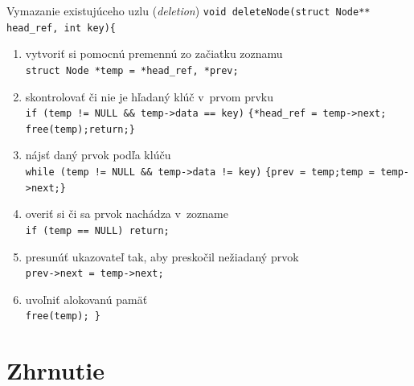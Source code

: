 \documentclass[slovak, 11pt]{beamer}
\begin{document}
\begin{frame}[fragile]{}
\small
    \begin{exampleblock}{Vymazanie existujúceho uzlu (\emph{deletion})}
        \verb|void deleteNode(struct Node** head_ref, int key){|
        \begin{enumerate}
            \item {\color{red!70!black}vytvoriť si pomocnú premennú zo začiatku zoznamu}\\
            \verb|struct Node *temp = *head_ref, *prev;|
            \item {\color{red!70!black}skontrolovať či nie je hľadaný klúč v~prvom prvku}\\
            {\footnotesize\verb|if (temp != NULL && temp->data == key)|
            \verb|{*head_ref = temp->next; free(temp);return;}|}
            \item {\color{red!70!black}nájsť daný prvok podľa klúču}\\
            {\footnotesize\verb|while (temp != NULL && temp->data != key)|
            \verb|{prev = temp;temp = temp->next;}|}
            \item {\color{red!70!black}overiť si či sa prvok nachádza v~zozname}\\
            \verb|if (temp == NULL) return;|
            \item {\color{red!70!black}presunúť ukazovateľ tak, aby preskočil nežiadaný prvok}\\
            \verb|prev->next = temp->next;|
            \item {\color{red!70!black}uvoľniť alokovanú pamäť}\\
            \verb|free(temp); }|
        \end{enumerate}
    \end{exampleblock}
\end{frame}


\section{Zhrnutie}
\end{document}
